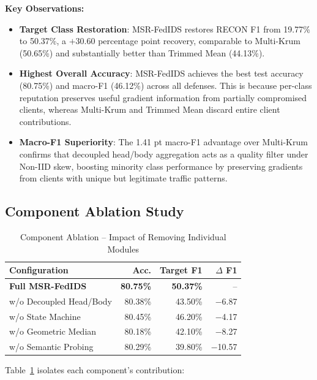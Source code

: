 \documentclass[conference]{IEEEtran}
\begin{document}
\textbf{Key Observations:}
\begin{itemize}
    \item \textbf{Target Class Restoration}: MSR-FedIDS restores RECON F1 from 19.77\% to 50.37\%, a $+$30.60 percentage point recovery, comparable to Multi-Krum (50.65\%) and substantially better than Trimmed Mean (44.13\%).
    \item \textbf{Highest Overall Accuracy}: MSR-FedIDS achieves the best test accuracy (80.75\%) and macro-F1 (46.12\%) across all defenses. This is because per-class reputation preserves useful gradient information from partially compromised clients, whereas Multi-Krum and Trimmed Mean discard entire client contributions.
    \item \textbf{Macro-F1 Superiority}: The 1.41 pt macro-F1 advantage over Multi-Krum confirms that decoupled head/body aggregation acts as a quality filter under Non-IID skew, boosting minority class performance by preserving gradients from clients with unique but legitimate traffic patterns.
\end{itemize}

\subsection{Component Ablation Study}

\begin{table}[t]
\caption{Component Ablation -- Impact of Removing Individual Modules}
\label{tab:ablation}
\centering
\begin{tabular}{@{}lrrr@{}}
\toprule
\textbf{Configuration} & \textbf{Acc.} & \textbf{Target F1} & \textbf{$\Delta$ F1} \\
\midrule
\textbf{Full MSR-FedIDS} & \textbf{80.75\%} & \textbf{50.37\%} & -- \\
w/o Decoupled Head/Body & 80.38\% & 43.50\% & $-$6.87 \\
w/o State Machine & 80.45\% & 46.20\% & $-$4.17 \\
w/o Geometric Median & 80.18\% & 42.10\% & $-$8.27 \\
w/o Semantic Probing & 80.29\% & 39.80\% & $-$10.57 \\
\bottomrule
\end{tabular}
\end{table}

Table~\ref{tab:ablation} isolates each component's contribution:
\end{document}
